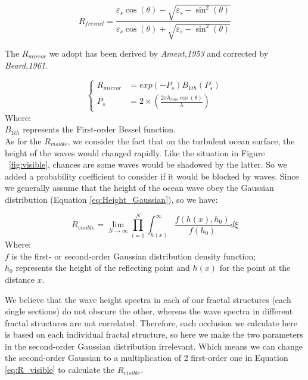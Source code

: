\documentclass{mcmthesis}
\begin{document}
      \begin{equation}\label{eq:R_Fesnel}
        R_{fresnel} = \frac{\varepsilon_s \cos(\theta) - \sqrt{\varepsilon_s - \sin^2(\theta)}}{\varepsilon_s \cos(\theta) + \sqrt{\varepsilon_s - \sin^2(\theta)}}
      \end{equation}

    The $R_{mirror}$ we adopt has been derived by \emph{Ament,1953}\cite{ament1953toward} and corrected by \emph{Beard,1961}\cite{beard1961coherent}.

    \begin{equation}\label{eq:R_mirror}
    \left\{
    \begin{aligned}
        R_{mirror} &= exp(- P_s) B_{1th}(P_s) \\
        P_s &= 2 \times (\frac{2\pi h_{rms} \cos(\theta)}{\lambda})
    \end{aligned}
    \right.
    \end{equation}
    Where:\\
    $B_{1th}$ represents the First-order Bessel function.\\

    As for the $R_{visible}$, we consider the fact that on the turbulent ocean surface, the height of the waves would changed rapidly. Like the situation in Figure ~\ref{fig:visible}, chances are some waves would be shadowed by the latter. So we added a probability coefficient to consider if it would be blocked by waves. Since we generally assume that the height of the ocean wave obey the Gaussian distribution (Equation \ref{eq:Height_Gaussian}), so we have:

    \begin{equation}\label{eq:R_visible}
      R_{visible} = \lim_{N \to \infty} \prod_{i=1}^N \int_{h(x)}^{\infty} \frac{f(h(x),h_0)}{f(h_0)}d\xi
    \end{equation}
    Where:\\
    $f$ is the first- or second-order Gaussian distribution density function;\\
    $h_{0}$ represents the height of the reflecting point and $h(x)$ for the point at the distance $x$.

    We believe that the wave height spectra in each of our fractal structures (each single sections) do not obscure the other, whereas the wave spectra in different fractal structures are not correlated. Therefore, each occlusion we calculate here is based on each individual fractal structure, so here we make the two parameters in the second-order Gaussian distribution irrelevant. Which means we can change the second-order Gaussian to a multiplication of 2 first-order one in Equation \ref{eq:R_visible} to calculate the $R_{visible}$.
\end{document}
